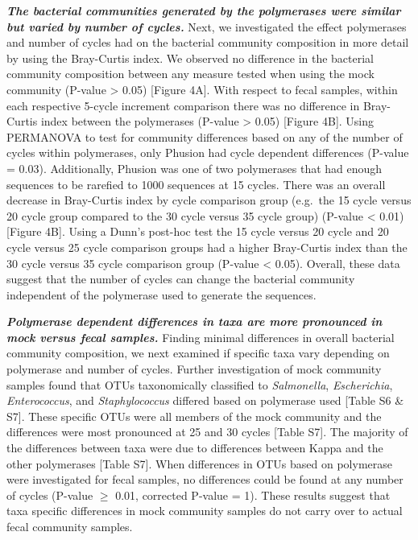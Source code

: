 \documentclass[11pt,]{article}
\begin{document}
\textbf{\emph{The bacterial communities generated by the polymerases
were similar but varied by number of cycles.}} Next, we investigated the
effect polymerases and number of cycles had on the bacterial community
composition in more detail by using the Bray-Curtis index. We observed
no difference in the bacterial community composition between any measure
tested when using the mock community (P-value \textgreater{} 0.05)
{[}Figure 4A{]}. With respect to fecal samples, within each respective
5-cycle increment comparison there was no difference in Bray-Curtis
index between the polymerases (P-value \textgreater{} 0.05) {[}Figure
4B{]}. Using PERMANOVA to test for community differences based on any of
the number of cycles within polymerases, only Phusion had cycle
dependent differences (P-value = 0.03). Additionally, Phusion was one of
two polymerases that had enough sequences to be rarefied to 1000
sequences at 15 cycles. There was an overall decrease in Bray-Curtis
index by cycle comparison group (e.g.~the 15 cycle versus 20 cycle group
compared to the 30 cycle versus 35 cycle group) (P-value \textless{}
0.01) {[}Figure 4B{]}. Using a Dunn's post-hoc test the 15 cycle versus
20 cycle and 20 cycle versus 25 cycle comparison groups had a higher
Bray-Curtis index than the 30 cycle versus 35 cycle comparison group
(P-value \textless{} 0.05). Overall, these data suggest that the number
of cycles can change the bacterial community independent of the
polymerase used to generate the sequences.

\textbf{\emph{Polymerase dependent differences in taxa are more
pronounced in mock versus fecal samples.}} Finding minimal differences
in overall bacterial community composition, we next examined if specific
taxa vary depending on polymerase and number of cycles. Further
investigation of mock community samples found that OTUs taxonomically
classified to \emph{Salmonella}, \emph{Escherichia},
\emph{Enterococcus}, and \emph{Staphylococcus} differed based on
polymerase used {[}Table S6 \& S7{]}. These specific OTUs were all
members of the mock community and the differences were most pronounced
at 25 and 30 cycles {[}Table S7{]}. The majority of the differences
between taxa were due to differences between Kappa and the other
polymerases {[}Table S7{]}. When differences in OTUs based on polymerase
were investigated for fecal samples, no differences could be found at
any number of cycles (P-value \(\geqslant\) 0.01, corrected P-value =
1). These results suggest that taxa specific differences in mock
community samples do not carry over to actual fecal community samples.
\end{document}
